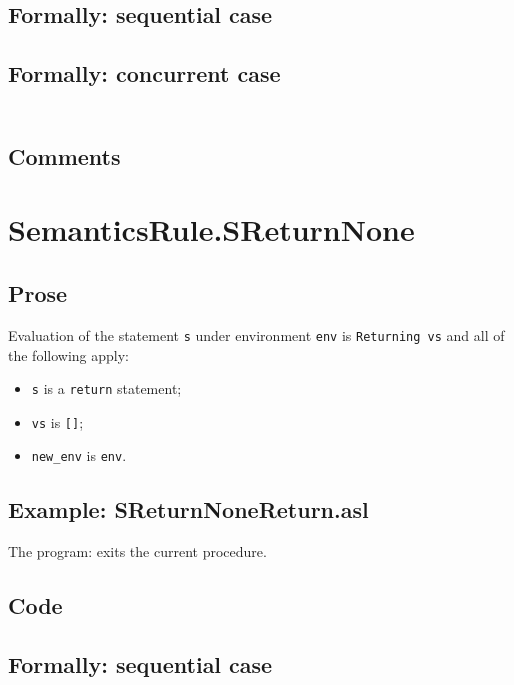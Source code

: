 \documentclass{book}
\begin{document}
  \subsection{Formally: sequential case}

  \subsection{Formally: concurrent case}
  \begin{align}
  \end{align} 

  \subsection{Comments}

\section{SemanticsRule.SReturnNone \label{sec:SemanticsRule.SReturnNone}}

    \subsection{Prose}
Evaluation of the statement \texttt{s} under environment \texttt{env} is
\texttt{Returning vs} and all of the following apply:
    \begin{itemize}
    \item \texttt{s} is a \texttt{return} statement;
    \item \texttt{vs} is \texttt{[]};
    \item \texttt{new\_env} is \texttt{env}.
    \end{itemize}

    \subsection{Example: SReturnNoneReturn.asl}
    The program:
    exits the current procedure.

  \subsection{Code}

  \subsection{Formally: sequential case}
  \begin{align}
  \end{align} 
\end{document}
